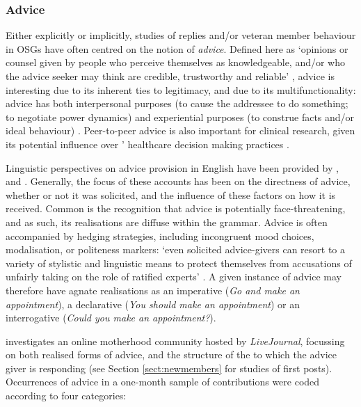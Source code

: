 
\subsubsection{Advice} \label{sect:advice}

Either explicitly or implicitly, studies of replies and\slash or veteran \gls{member} behaviour in \glspl{OSG} have often centred on the notion of \emph{advice}. Defined here as `opinions or counsel given by people who perceive themselves as knowledgeable, and\slash or who the advice seeker may think are credible, trustworthy and reliable' \cite[a definition taken from][p.~519]{decapua_strategies_1993}, advice is interesting due to its inherent ties to legitimacy, and due to its multifunctionality: advice has both interpersonal purposes (to cause the addressee to do something; to negotiate power dynamics) and experiential purposes (to construe facts and\slash or ideal behaviour) \cite{heritage_dilemmas_1992}. Peer\hyp{}to\hyp{}peer advice is also important for clinical research, given its potential influence over ' healthcare decision making practices \cite{jones_health_2013,sillence_giving_2013}.

Linguistic perspectives on advice provision in English have been provided by \textcite{hudson1990discourse}, \textcite{decapua_`if_1995} and \textcite{decapua_strategies_1993}. Generally, the focus of these accounts has been on the directness of advice, whether or not it was solicited, and the influence of these factors on how it is received. Common is the recognition that advice is potentially face\hyp{}threatening, and as such, its realisations are diffuse within the grammar. Advice is often accompanied by hedging strategies, including incongruent mood choices, modalisation, or politeness markers: `even solicited advice\hyp{}givers can resort to a variety of stylistic and linguistic means to protect themselves from accusations of unfairly taking on the role of ratified experts' \cite[p.~126]{decapua_`if_1995}. A given instance of advice may therefore have agnate realisations as an imperative (\emph{Go and make an appointment}), a declarative (\emph{You should make an appointment}) or an interrogative (\emph{Could you make an appointment?}).

\textcite{kouper_pragmatics_2010} investigates an online motherhood community hosted by \emph{LiveJournal}, focussing on both realised forms of advice, and the structure of the  to which the advice giver is responding (see Section \ref{sect:newmembers} for studies of first \glspl{post}). Occurrences of advice in a one\hyp{}month sample of contributions were coded according to four categories: 

